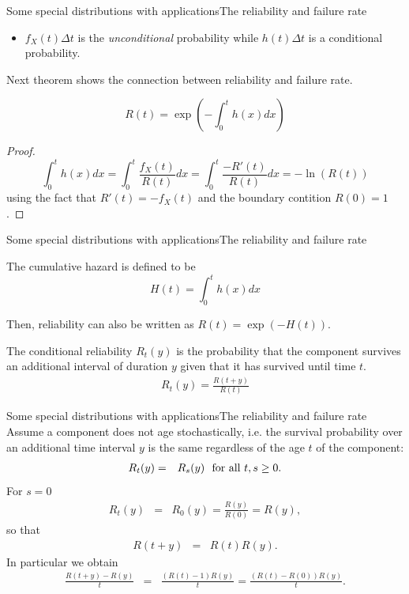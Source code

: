 \documentclass[handout]{beamer}
\begin{document}
\begin{frame}{Some special distributions with applications}{The reliability and failure rate}%
\begin{itemize}
 \item $f_X(t) \Delta t$ is the \textit{unconditional} probability while $h(t)\Delta t$ is a conditional probability.
\end{itemize}
Next theorem shows the connection between reliability and failure rate.
\begin{theorem}
 \[
R(t) = \exp\left( - \int_0^t h(x)dx \right)  
 \]
\end{theorem}
\begin{proof}
\[
  \int_0^t h(x)dx  =  \int_0^t \frac{f_X(t)}{R(t)}dx =\int_0^t \frac{-R'(t)}{R(t)}dx = - \ln(R(t))
\]
using the fact that $R'(t)=-f_X(t)$ and the boundary contition $R(0)=1$.
\end{proof}

\end{frame}

\begin{frame}{Some special distributions with applications}{The reliability and failure rate}
 \begin{definition}
  The cumulative hazard is defined to be 
\[
 H(t) = \int_0^t h(x) dx
\]
 \end{definition}
Then, reliability can also be written as $R(t) = \exp(-H(t))$.
\begin{definition}\label{DefConditionalReliability}
The conditional reliability $R_t(y)$ is the probability that the component survives an additional 
interval of duration $y$ given that it has survived until time $t$.
\begin{eqnarray}
 R_t(y) =  \frac{R(t+y)}{R(t)} \label{conditionalReliability}
\end{eqnarray}
 \end{definition}
\end{frame}

\begin{frame}{Some special distributions with applications}{The reliability and failure rate}
Assume a component does not age stochastically, i.e. the survival probability over an additional
time interval $y$ is the same regardless of the age $t$ of the component:
\begin{eqnarray*}
 R_t(y) &=& R_s(y) \textnormal{ \ for all } t,s \geq 0.
\end{eqnarray*}
For $s=0$
\begin{eqnarray*}
 R_t(y) &=& R_0(y) = \frac{R(y)}{R(0)} = R(y),
\end{eqnarray*}
so that
\begin{eqnarray*}
 R(t+y) &=& R(t) R(y).
\end{eqnarray*}
In particular we obtain
\begin{eqnarray*}
 \frac{R(t+y) - R(y)}{t} &=& \frac{(R(t)-1)R(y)}{t}=\frac{(R(t)-R(0))R(y)}{t}.
\end{eqnarray*}
\end{frame}
\end{document}
